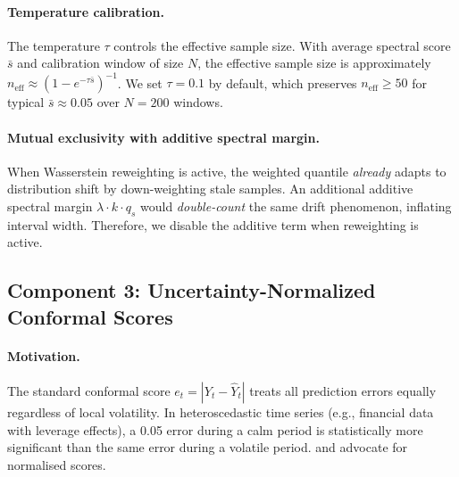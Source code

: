 \paragraph{Temperature calibration.}
The temperature $\tau$ controls the effective sample size.  With average
spectral score $\bar{s}$ and calibration window of size $N$, the effective
sample size is approximately
$n_{\mathrm{eff}} \approx (1-e^{-\tau\bar{s}})^{-1}$.  We set
$\tau = 0.1$ by default, which preserves $n_{\mathrm{eff}} \ge 50$ for
typical $\bar{s} \approx 0.05$ over $N=200$ windows.

\paragraph{Mutual exclusivity with additive spectral margin.}
When Wasserstein reweighting is active, the weighted quantile
\emph{already} adapts to distribution shift by down-weighting stale
samples.  An additional additive spectral margin $\lambda \cdot k \cdot
q_s$ would \emph{double-count} the same drift phenomenon, inflating
interval width.  Therefore, we disable the additive term when
reweighting is active.

\subsection{Component 3: Uncertainty-Normalized Conformal Scores}
\label{sec:score-normalization}

\paragraph{Motivation.}
The standard conformal score $e_t = |Y_t - \hat{Y}_t|$ treats all
prediction errors equally regardless of local volatility.  In
heteroscedastic time series (e.g., financial data with leverage effects),
a 0.05 error during a calm period is statistically more significant than
the same error during a volatile period.  \citet{lei2018distribution}
and \citet{papadopoulos2002inductive} advocate for normalised scores.

